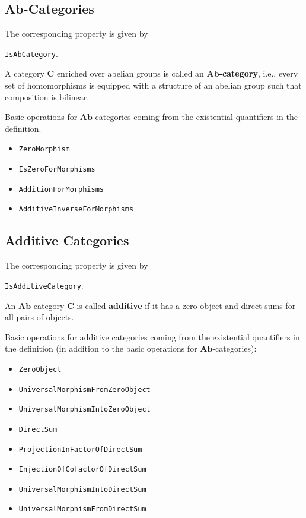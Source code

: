 \subsection{Ab-Categories}

\begin{documentation}
 The corresponding \GAP property is given by
 \begin{center}
  \texttt{IsAbCategory}.  
 \end{center}
\end{documentation}

\begin{definition}
 A category $\mathbf{C}$ enriched over abelian groups is called an \textbf{$\mathbf{Ab}$-category}, i.e.,
 every set of homomorphisms is equipped with a structure of an abelian group
 such that composition is bilinear.
\end{definition}

Basic operations for $\mathbf{Ab}$-categories coming from the existential quantifiers
in the definition.
\begin{itemize}
 \item \texttt{ZeroMorphism}
 \item \texttt{IsZeroForMorphisms}
 \item \texttt{AdditionForMorphisms}
 \item \texttt{AdditiveInverseForMorphisms}
\end{itemize}

\subsection{Additive Categories}

\begin{documentation}
 The corresponding \GAP property is given by
 \begin{center}
  \texttt{IsAdditiveCategory}.  
 \end{center}
\end{documentation}

\begin{definition}
 An $\mathbf{Ab}$-category $\mathbf{C}$ is called \textbf{additive}
 if it has a zero object and direct sums for all pairs of objects.
\end{definition}

Basic operations for additive categories coming from the existential quantifiers
in the definition
(in addition to the basic operations for $\mathbf{Ab}$-categories):
\begin{itemize}
 \item \texttt{ZeroObject}
 \item \texttt{UniversalMorphismFromZeroObject}
 \item \texttt{UniversalMorphismIntoZeroObject}
 \item \texttt{DirectSum}
 \item \texttt{ProjectionInFactorOfDirectSum}
 \item \texttt{InjectionOfCofactorOfDirectSum}
 \item \texttt{UniversalMorphismIntoDirectSum}
 \item \texttt{UniversalMorphismFromDirectSum}
\end{itemize}



